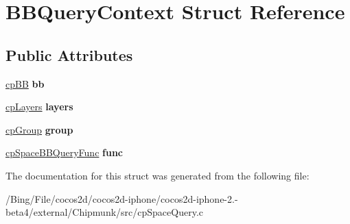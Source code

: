 \hypertarget{struct_b_b_query_context}{\section{B\-B\-Query\-Context Struct Reference}
\label{struct_b_b_query_context}
}
\subsection*{Public Attributes}
\begin{DoxyCompactItemize}
\item 
\hypertarget{struct_b_b_query_context_a495aa056afbb88eead16006260bfb22c}{\hyperlink{structcp_b_b}{cp\-B\-B} {\bfseries bb}}\label{struct_b_b_query_context_a495aa056afbb88eead16006260bfb22c}

\item 
\hypertarget{struct_b_b_query_context_abd28dd7786bcd5a19b4a612332404b97}{\hyperlink{group__basic_types_ga5ec31e87ed3973cab80f9bfbbbcb43bb}{cp\-Layers} {\bfseries layers}}\label{struct_b_b_query_context_abd28dd7786bcd5a19b4a612332404b97}

\item 
\hypertarget{struct_b_b_query_context_a7d6682ec1aee3fff92b313c8cd4b69f3}{\hyperlink{group__basic_types_gacd811b1135a8f4a3e5cc019552b18b1a}{cp\-Group} {\bfseries group}}\label{struct_b_b_query_context_a7d6682ec1aee3fff92b313c8cd4b69f3}

\item 
\hypertarget{struct_b_b_query_context_a2cc73364e6634a0a7d4763962b2a4f3f}{\hyperlink{group__cp_space_ga9f9d412c914ddec134554dde01dffbad}{cp\-Space\-B\-B\-Query\-Func} {\bfseries func}}\label{struct_b_b_query_context_a2cc73364e6634a0a7d4763962b2a4f3f}

\end{DoxyCompactItemize}


The documentation for this struct was generated from the following file\-:\begin{DoxyCompactItemize}
\item 
/\-Bing/\-File/cocos2d/cocos2d-\/iphone/cocos2d-\/iphone-\/2.-\/beta4/external/\-Chipmunk/src/cp\-Space\-Query.\-c\end{DoxyCompactItemize}
